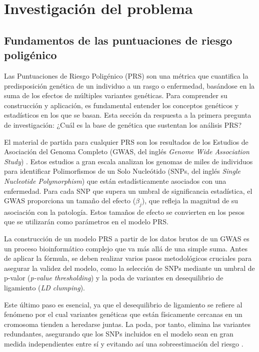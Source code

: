 \chapter{Investigación del problema}
\label{chap:investigación}

\section{Fundamentos de las puntuaciones de riesgo poligénico}

Las Puntuaciones de Riesgo Poligénico (PRS) son una métrica que cuantifica la predisposición genética de un individuo a un rasgo o enfermedad, basándose en la suma de los efectos de múltiples variantes genéticas. Para comprender su construcción y aplicación, es fundamental entender los conceptos genéticos y estadísticos en los que se basan. Esta sección da respuesta a la primera pregunta de investigación: ¿Cuál es la base de genética que sustentan los análisis PRS?

El material de partida para cualquier PRS son los resultados de los Estudios de Asociación del Genoma Completo (GWAS, del inglés \textit{Genome Wide Association Study}) \cite{babb, uffelmann}. Estos estudios a gran escala analizan los genomas de miles de individuos para identificar Polimorfismos de un Solo Nucleótido (SNPs, del inglés \textit{Single Nucleotide Polymorphism}) \cite{choi} que están estadísticamente asociados con una enfermedad. Para cada SNP que supera un umbral de significancia estadística, el GWAS proporciona un tamaño del efecto ($\beta_j$), que refleja la magnitud de su asociación con la patología. Estos tamaños de efecto se convierten en los pesos que se utilizarán como parámetros en el modelo PRS.

La construcción de un modelo PRS a partir de los datos brutos de un GWAS es un proceso bioinformático complejo que va más allá de una simple suma. Antes de aplicar la fórmula, se deben realizar varios pasos metodológicos cruciales para asegurar la validez del modelo, como la selección de SNPs mediante un umbral de p-valor (\textit{p-value thresholding}) y la poda de variantes en desequilibrio de ligamiento (\textit{LD clumping}). 

Este último paso es esencial, ya que el desequilibrio de ligamiento se refiere al fenómeno por el cual variantes genéticas que están físicamente cercanas en un cromosoma tienden a heredarse juntas. La poda, por tanto, elimina las variantes redundantes, asegurando que los SNPs incluidos en el modelo sean en gran medida independientes entre sí y evitando así una sobreestimación del riesgo \cite{lambert2019}.

